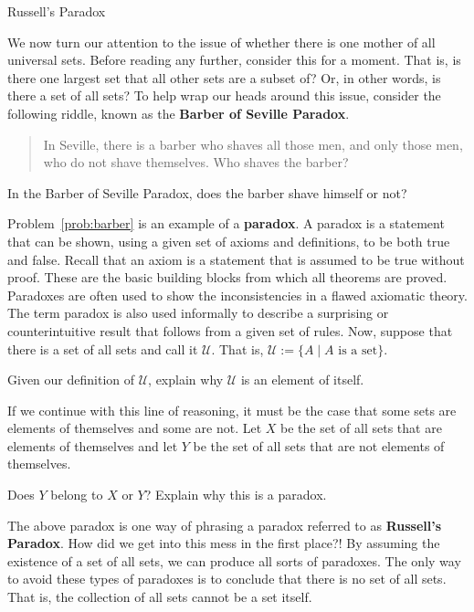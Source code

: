 \begin{section}{Russell's Paradox}\label{sec:RussellsParadox}

We now turn our attention to the issue of whether there is one mother of all universal sets.  Before reading any further, consider this for a moment.  That is, is there one largest set that all other sets are a subset of?  Or, in other words, is there a set of all sets?  To help wrap our heads around this issue, consider the following riddle, known as the \textbf{Barber of Seville Paradox}.

\begin{quote}
In Seville, there is a barber who shaves all those men, and only those men, who do not shave themselves.  Who shaves the barber?
\end{quote}

\begin{problem}\label{prob:barber}
In the Barber of Seville Paradox, does the barber shave himself or not?
\end{problem}

Problem~\ref{prob:barber} is an example of a \textbf{paradox}. A paradox is a statement that can be shown, using a given set of axioms and definitions, to be both true and false. Recall that an axiom is a statement that is assumed to be true without proof. These are the basic building blocks from which all theorems are proved. Paradoxes are often used to show the inconsistencies in a flawed axiomatic theory.  The term paradox is also used informally to describe a surprising or counterintuitive result that follows from a given set of rules.  Now, suppose that there is a set of all sets and call it $\mathcal{U}$.  That is, $\mathcal{U}:=\{A\mid A\mbox{ is a set}\}$.

\begin{problem}
Given our definition of $\mathcal{U}$, explain why $\mathcal{U}$ is an element of itself.
\end{problem}

If we continue with this line of reasoning, it must be the case that some sets are elements of themselves and some are not.  Let $X$ be the set of all sets that are elements of themselves and let $Y$ be the set of all sets that are not elements of themselves.

\begin{problem}\label{prob:russell}
Does $Y$ belong to $X$ or $Y$?  Explain why this is a paradox.
\end{problem}

The above paradox is one way of phrasing a paradox referred to as \textbf{Russell's Paradox}.  How did we get into this mess in the first place?!  By assuming the existence of a set of all sets, we can produce all sorts of paradoxes.  The only way to avoid these types of paradoxes is to conclude that there is no set of all sets.  That is, the collection of all sets cannot be a set itself.


\end{section}
